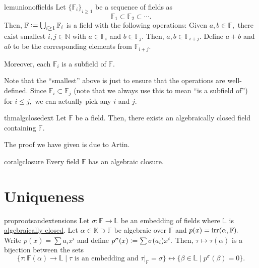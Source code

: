 \begin{restatable}[]{lem}{unionoffields}
\label{lem:unionoffields}
    Let $\{\mathbb{F}_i\}_{i \ge 1}$ be a sequence of fields as
    \begin{equation*} 
        \mathbb{F}_1 \subset \mathbb{F}_2 \subset \cdots.
    \end{equation*}
    Then, $\mathbb{F} \vcentcolon= \bigcup_{i \ge 1}\mathbb{F}_i$ is a field with the following operations:
    Given $a, b \in \mathbb{F},$ there exist smallest $i, j \in \mathbb{N}$ with $a \in \mathbb{F}_i$ and $b \in \mathbb{F}_j.$ Then, $a, b \in \mathbb{F}_{i + j}.$ Define $a + b$ and $ab$ to be the corresponding elements from $\mathbb{F}_{i + j}.$

    Moreover, each $\mathbb{F}_i$ is a subfield of $\mathbb{F}.$ \hfill\hyperref[lem:unionoffields2]{\downsym}
\end{restatable}

Note that the ``smallest'' above is just to ensure that the operations are well-defined. Since $\mathbb{F}_i \subset \mathbb{F}_j$ (note that we always use this to mean ``is a subfield of'') for $i \le j,$ we can actually pick any $i$ and $j.$

\begin{restatable}{thm}{algclosedext}
\label{thm:algclosedext}
    Let $\mathbb{F}$ be a field. Then, there exists an algebraically closed field containing $\mathbb{F}.$ \hfill\hyperref[thm:algclosedext2]{\downsym}
\end{restatable}
The proof we have given is due to Artin.

\begin{restatable}{cor}{algclosure}
\label{cor:algclosure}
    Every field $\mathbb{F}$ has an algebraic closure. \hfill\hyperref[cor:algclosure2]{\downsym}
\end{restatable}

\section{Uniqueness}

\begin{restatable}[]{prop}{rootsandextensions}
\label{prop:rootsandextensions}
    Let $\sigma : \mathbb{F} \to \mathbb{L}$ be an embedding of fields where $\mathbb{L}$ is \underline{algebraically closed}. Let $\alpha \in \mathbb{K} \supset \mathbb{F}$ be algebraic over $\mathbb{F}$ and $p(x) = \operatorname{irr}(\alpha, \mathbb{F}).$ \\
    Write $p(x) = \sum a_i x^i$ and define $p^{\sigma}(x) \vcentcolon= \sum \sigma(a_i) x^i.$ Then, $\tau \mapsto \tau(\alpha)$ is a bijection between the sets
    \begin{equation*} 
        \{\tau : \mathbb{F}(\alpha) \to \mathbb{L} \mid \tau \text{ is an embedding and }\tau|_{\mathbb{F}} = \sigma\} \leftrightarrow \{\beta \in \mathbb{L} \mid p^{\sigma}(\beta) = 0\}.
    \end{equation*} \hfill\hyperref[prop:rootsandextensions2]{\downsym}
\end{restatable}

